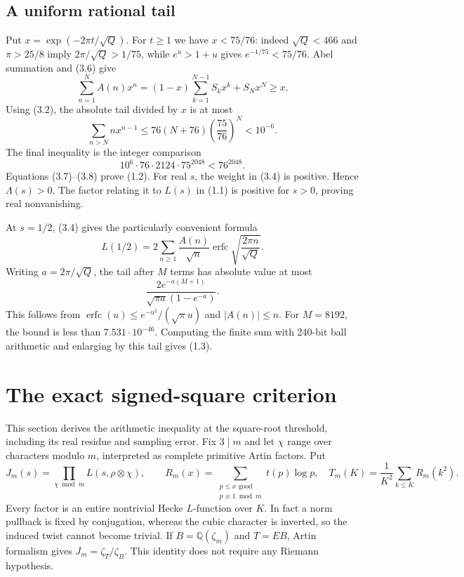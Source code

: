 \documentclass[11pt]{article}
\newcommand{\Q}{\mathbb Q}
\begin{document}
\subsection{A uniform rational tail}
Put $x=\exp(-2\pi t/\sqrt Q)$. For $t\ge1$ we have $x<75/76$: indeed $\sqrt Q<466$ and $\pi>25/8$ imply $2\pi/\sqrt Q>1/75$, while $e^u>1+u$ gives $e^{-1/75}<75/76$. Abel summation and (3.6) give
\[
 \sum_{n=1}^N A(n)x^n
  =(1-x)\sum_{k=1}^{N-1}S_kx^k+S_Nx^N\ge x.
 \tag{3.7}
\]
Using (3.2), the absolute tail divided by $x$ is at most
\[
 \sum_{n>N}n x^{n-1}
 \le 76(N+76)\left(\frac{75}{76}\right)^N
 <10^{-6}.
 \tag{3.8}
\]
The final inequality is the integer comparison
\[
 10^6\cdot76\cdot2124\cdot75^{2048}<76^{2048}.
\]
Equations (3.7)--(3.8) prove (1.2). For real $s$, the weight in (3.4) is positive. Hence $\Lambda(s)>0$. The factor relating it to $L(s)$ in (1.1) is positive for $s>0$, proving real nonvanishing.

At $s=1/2$, (3.4) gives the particularly convenient formula
\[
 L(1/2)=2\sum_{n\ge1}\frac{A(n)}{\sqrt n}
                  \operatorname{erfc}\sqrt{\frac{2\pi n}{\sqrt Q}}.
 \tag{3.9}
\]
Writing $a=2\pi/\sqrt Q$, the tail after $M$ terms has absolute value at most
\[
 \frac{2e^{-a(M+1)}}{\sqrt{\pi a}(1-e^{-a})}.
 \tag{3.10}
\]
This follows from $\operatorname{erfc}(u)\le e^{-u^2}/(\sqrt\pi u)$ and $|A(n)|\le n$. For $M=8192$, the bound is less than $7.531\cdot10^{-46}$. Computing the finite sum with 240-bit ball arithmetic and enlarging by this tail gives (1.3).

\section{The exact signed-square criterion}
This section derives the arithmetic inequality at the square-root threshold, including its real residue and sampling error.
Fix $3\mid m$ and let $\chi$ range over characters modulo $m$, interpreted as complete primitive Artin factors. Put
\[
 J_m(s)=\prod_{\chi\bmod m}L(s,\rho\otimes\chi),\qquad
 R_m(x)=\sum_{\substack{p\le x\text{ good}\\p\equiv1\bmod m}}t(p)\log p,
 \quad T_m(K)=\frac1{K^2}\sum_{k\le K}R_m(k^2).
 \tag{4.1}
\]
Every factor is an entire nontrivial Hecke $L$-function over $K$. In fact a norm pullback is fixed by conjugation, whereas the cubic character is inverted, so the induced twist cannot become trivial. If $B=\Q(\zeta_m)$ and $T=EB$, Artin formalism gives $J_m=\zeta_T/\zeta_B$. This identity does not require any Riemann hypothesis.
\end{document}
